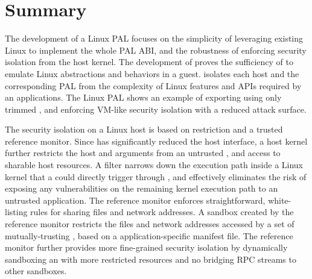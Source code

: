 \section{Summary}


The development of a Linux PAL focuses
on the simplicity of leveraging existing Linux \linuxapis{} to implement
the whole PAL ABI,
and the robustness of enforcing security isolation
from the host kernel.
The development of \thelibos{} proves the sufficiency of \thehostabi{} to emulate Linux abstractions and behaviors in a guest.
\Thehostabi{} isolates each host
and the corresponding PAL
from the complexity of Linux features and APIs required by an applications.
The Linux PAL
shows an example of exporting \thehostabi{} using only \hostsyscallnum{} trimmed \linuxapis{},
and enforcing VM-like security isolation
with a reduced attack surface.


The security isolation on a Linux host is based on \linuxapi{} restriction and a trusted reference monitor.
Since \thelibos{} has significantly reduced the host interface,
a host kernel further restricts the host \linuxapis{} and arguments from an untrusted \picoproc{},
and access to sharable host resources.
A \seccomp{} filter
narrows down the execution path inside a Linux kernel that a \picoproc{} could directly trigger through \linuxapis{},
and effectively eliminates
the risk of exposing any vulnerabilities on the remaining kernel execution path to an untrusted application.
The reference monitor enforces straightforward, white-listing rules
for sharing files and network addresses.
A sandbox created by the reference monitor restricts
the files and network addresses accessed by a set of mutually-trusting \picoproc{}, based on a application-specific manifest file.
The reference monitor further provides more fine-grained security isolation
by dynamically sandboxing an \picoproc{}
with more restricted resources and no bridging RPC streams to other sandboxes.





